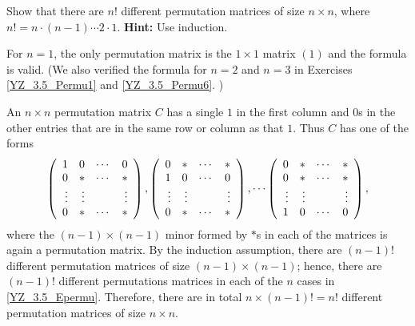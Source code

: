\documentclass{ximera}
\begin{document}
\begin{exercise} \label{YZ_3.5_Permu7}
Show that there are $n!$ different permutation matrices of size $n\times n$, where $n!=n\cdot (n-1)\cdots 2\cdot 1$.
{\bf Hint:} Use induction.

\begin{solution}
\soln

For $n=1$, the only permutation matrix is the $1\times 1$ matrix $(1)$ and the formula is valid. (We also verified the formula for $n=2$ and $n = 3$ in Exercises \ref{YZ_3.5_Permu1} and \ref{YZ_3.5_Permu6}. )

An $n\times n$ permutation matrix $C$ has a single $1$ in the first column and $0$s in the other entries that are in the same row or column as that $1$. Thus $C$ has one of the forms
\begin{equation}\label{YZ_3.5_Epermu}
\left(\begin{array}{rrrrrrrrrrrrrrrrrr} 1&0&\cdots &0\\0&*&\cdots &*\\\vdots&\vdots&&\vdots\\0&*&\cdots&* \end{array}\right), \left(\begin{array}{rrrrrrrrrrrrrrrrrr} 0&*&\cdots &*\\1&0&\cdots &0\\\vdots&\vdots&&\vdots\\0&*&\cdots&* \end{array}\right),\cdots \left(\begin{array}{rrrrrrrrrrrrrrrrrr} 0&*&\cdots&*\\0&*&\cdots &*\\\vdots&\vdots&&\vdots\\1&0&\cdots &0 \end{array}\right),
\end{equation}
where the $(n-1)\times (n-1)$ minor formed by $*$s in each of the matrices is again a permutation matrix. By the induction assumption, there are $(n-1)!$ different permutation matrices of size $(n-1)\times (n-1)$; hence, there are $(n-1)!$ different permutations matrices in each of the $n$ cases in \eqref{YZ_3.5_Epermu}. Therefore, there are in total $n\times (n-1)! = n!$ different permutation matrices of size $n\times n$.
\end{solution}
\end{exercise}
\end{document}
